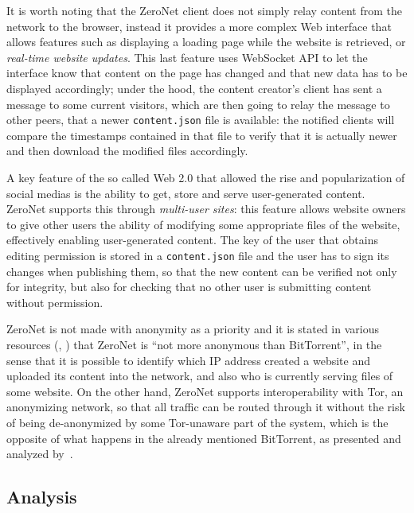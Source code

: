 \documentclass[mscthesis]{usiinfthesis}
\begin{document}
It is worth noting that the ZeroNet client does not simply relay content from the network to the browser, instead it provides a more complex Web interface that allows features such as displaying a loading page while the website is retrieved, or \emph{real-time website updates}. This last feature uses WebSocket API to let the interface know that content on the page has changed and that new data has to be displayed accordingly; under the hood, the content creator's client has sent a message to some current visitors, which are then going to relay the message to other peers, that a newer \texttt{content.json} file is available: the notified clients will compare the timestamps contained in that file to verify that it is actually newer and then download the modified files accordingly.

A key feature of the so called Web 2.0 that allowed the rise and popularization of social medias is the ability to get, store and serve user-generated content. %
ZeroNet supports this through \emph{multi-user sites}: this feature allows website owners to give other users the ability of modifying some appropriate files of the website, effectively enabling user-generated content. The key of the user that obtains editing permission is stored in a \texttt{content.json} file and the user has to sign its changes when publishing them, so that the new content can be verified not only for integrity, but also for checking that no other user is submitting content without permission.

ZeroNet is not made with anonymity as a priority and it is stated in various resources (\cite{website:zeronetpresentation}, \cite{website:zeronetfaq}) that ZeroNet is ``not more anonymous than BitTorrent'', in the sense that it is possible to identify which IP address created a website and uploaded its content into the network, and also who is currently serving files of some website. On the other hand, ZeroNet supports interoperability with Tor, an anonymizing network, so that all traffic can be routed through it without the risk of being de-anonymized by some Tor-unaware part of the system, which is the opposite of what happens in the already mentioned BitTorrent, as presented and analyzed by~\cite{manils2010compromising}.

\subsection{Analysis}
\end{document}
